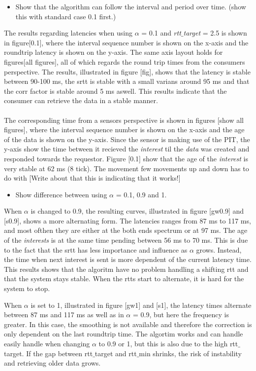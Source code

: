 \begin{itemize}
\item Show that the algorithm can follow the interval and period over time. (show this with standard case 0.1 first.)\\
\end{itemize}
The results regarding latencies when using $\alpha$ = 0.1 and \textit{rtt$\_$target} = 2.5 is shown in figure[0.1], where the interval sequence number is shown on the x-axis and the roundtrip latency is shown on the y-axis. The same axis layout holds for figures[all figures], all of which regards the round trip times from the consumers perspective. 
The results, illustrated in figure [fig], shows that the latency is stable between 90-100 ms, the srtt is stable with a small varians around 95 ms and that the corr factor is stable around 5 ms aswell. This results indicate that the consumer can retrieve the data in a stable manner.\\\\
The corresponding time from a sensors perspective is shown in figures [show all figures], where the interval sequence number is shown on the x-axis and the age of the data is shown on the y-axis. Since the sensor is making use of the PIT, the y-axis show the time between it recieved the \textit{interest} til the \textit{data} was created and responded towards the requestor. Figure [0.1] show that the age of the \textit{interest} is very stable at 62 ms (8 tick). The movement few movements up and down has to do with 
[Write about that this is indicating that it works!]


\begin{itemize}
\item Show difference between using $\alpha$ = 0.1, 0.9 and 1.
\end{itemize}
When $\alpha$ is changed to 0.9, the resulting curves, illustrated in figure [gw0.9] and [s0.9], shows a more alternating form. The latencies ranges from 87 ms to 117 ms, and most ofthen they are either at the both ends spectrum or at 97 ms. The age of the \textit{interests} is at the same time pending between 56 ms to 70 ms. This is due to the fact that the srtt has less importance and influence as $\alpha$ grows. Instead, the time when next interest is sent is more dependent of the current latency time. 
This results shows that the algoritm have no problem handling a shifting rtt and that the system stays stable. When the rtts start to alternate, it is hard for the system to stop. 

When $\alpha$ is set to 1, illustrated in figure [gw1] and [s1], the latency times alternate between 87 ms and 117 ms as well as in $\alpha$ = 0.9, but here the frequency is greater. In this case, the smoothing is not available and therefore the correction is only dependent on the last roundtrip time. The algortim works and can handle easily handle when changing $\alpha$ to 0.9 or 1, but this is also due to the high rtt$\_$target.  If the gap between rtt$\_$target and rtt$\_$min shrinks, the risk of instability and retrieving older data grows.

